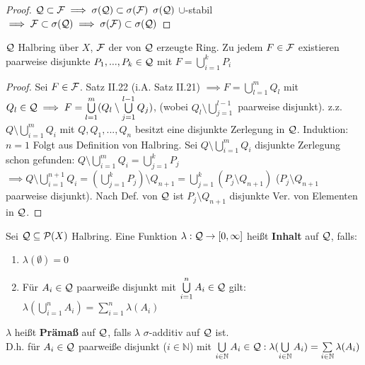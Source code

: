   \begin{proof}
    $\mathcal{Q} \subset \mathcal{F} \implies \sigma(\mathcal{Q}) \subset \sigma(\mathcal{F})$ \newline
    $\sigma(\mathcal{Q})$  $\cup$-stabil $\implies \mathcal{F}\subset \sigma(\mathcal{Q}) \implies \sigma(\mathcal{F}) \subset \sigma(\mathcal{Q})$
  \end{proof}

  \begin{lemma}[i.A. II.24]
    $\mathcal{Q}$ Halbring über $X$, $\mathcal{F}$ der von $\mathcal{Q}$ erzeugte Ring. Zu jedem $F \in \mathcal{F}$ existieren paarweise disjunkte $P_1, ..., P_k \in \mathcal{Q}$ mit $F = \bigcup\limits_{i=1}^k P_i$
  \end{lemma}

  \begin{proof}
    Sei $F\in \mathcal{F}$. \newline
    Satz II.22 (i.A. Satz II.21) $\implies F = \bigcup\limits_{l=1}^{m}Q_l$ mit $Q_l \in \mathcal{Q} \implies F = \bigcup\limits_{l=1}^{m}(Q_l\setminus \bigcup\limits_{j=1}^{l-1}Q_j)$, (wobei $Q_l\setminus \bigcup\limits_{j=1}^{l-1}$ paarweise disjunkt). \newline
    z.z. $Q\setminus \bigcup\limits_{i=1}^{m}Q_i$ mit $Q,Q_1,...,Q_n$ besitzt eine disjunkte Zerlegung in $\mathcal{Q}$. \newline
    Induktion: $n=1$ Folgt aus Definition von Halbring. Sei $Q\setminus\bigcup\limits_{i=1}^{m}Q_i$ disjunkte Zerlegung schon gefunden: $Q\setminus\bigcup\limits_{i=1}^{m}Q_i = \bigcup\limits_{j=1}^{k}P_j$ \newline
    $\implies Q\setminus\bigcup\limits_{i=1}^{n+1}Q_i = (\bigcup\limits_{j=1}^{k}P_j)\setminus Q_{n+1} = \bigcup\limits_{j=1}^{k}(P_j\setminus Q_{n+1})$ ($P_j\setminus Q_{n+1}$ paarweise disjunkt). \newline
    Nach Def. von $\mathcal{Q}$ ist $P_j\setminus Q_{n+1}$ disjunkte Ver. von Elementen in $\mathcal{Q}$. 
  \end{proof}

  \begin{definition}[i.A. II.25]
    Sei $\mathcal{Q} \subseteq \mathcal{P}(X)$ Halbring. Eine Funktion $\lambda: \mathcal{Q} \to [0, \infty]$ heißt \textbf{Inhalt} auf $\mathcal{Q}$, falls:
    \begin{enumerate}[label=\roman*)]
      \item $\lambda(\emptyset) = 0$
      \item Für $A_i \in \mathcal{Q}$ paarweiße disjunkt mit $\bigcup\limits_{i=1}^n A_i \in \mathcal{Q}$ gilt: $\lambda(\bigcup\limits_{i=1}^n A_i) = \sum\limits_{i=1}^n \lambda(A_i)$
    \end{enumerate}
    $\lambda$ heißt \textbf{Prämaß} auf $\mathcal{Q}$, falls $\lambda$ $\sigma$-additiv auf $\mathcal{Q}$ ist.\\
    D.h. für $A_i \in \mathcal{Q}$ paarweiße disjunkt ($i \in \mathbb{N}$) mit $\bigcup\limits_{i \in \mathbb{N}} A_i \in \mathcal{Q}: \lambda(\bigcup\limits_{i \in \mathbb{N}} A_i) = \sum\limits_{i \in \mathbb{N}} \lambda(A_i)$
  \end{definition}

